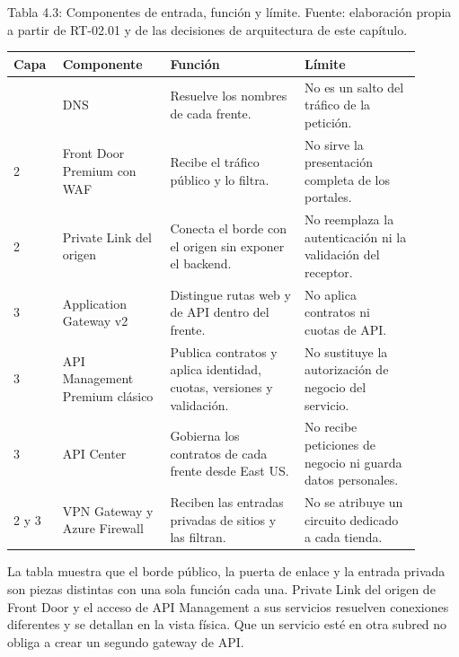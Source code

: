 \documentclass[11pt]{article}
\begin{document}
\par\vspace{0pt plus 10\baselineskip}\vspace{0pt plus -10\baselineskip}

Tabla 4.3: Componentes de entrada, función y límite. Fuente: elaboración propia a partir de RT-02.01 y de las decisiones de arquitectura de este capítulo.\par\nopagebreak
\begin{longtable}{@{}p{0.1\linewidth}p{0.24\linewidth}p{0.3\linewidth}p{0.26\linewidth}@{}}
\toprule Capa & Componente & Función & Límite \\
\midrule\endhead\bottomrule\endlastfoot
2 & DNS & Resuelve los nombres de cada frente. & No es un salto del tráfico de la petición. \\
2 & Front Door Premium con WAF & Recibe el tráfico público y lo filtra. & No sirve la presentación completa de los portales. \\
2 & Private Link del origen & Conecta el borde con el origen sin exponer el backend. & No reemplaza la autenticación ni la validación del receptor. \\
3 & Application Gateway v2 & Distingue rutas web y de API dentro del frente. & No aplica contratos ni cuotas de API. \\
3 & API Management Premium clásico & Publica contratos y aplica identidad, cuotas, versiones y validación. & No sustituye la autorización de negocio del servicio. \\
3 & API Center & Gobierna los contratos de cada frente desde East US. & No recibe peticiones de negocio ni guarda datos personales. \\
2 y 3 & VPN Gateway y Azure Firewall & Reciben las entradas privadas de sitios y las filtran. & No se atribuye un circuito dedicado a cada tienda. \\
\end{longtable}

La tabla muestra que el borde público, la puerta de enlace y la entrada privada son piezas distintas con una sola función cada una. Private Link del origen de Front Door y el acceso de API Management a sus servicios resuelven conexiones diferentes y se detallan en la vista física. Que un servicio esté en otra subred no obliga a crear un segundo gateway de API.
\end{document}
